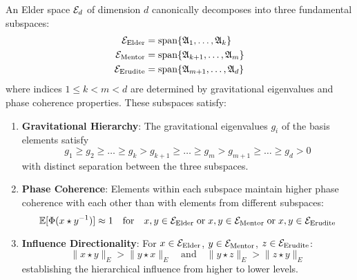 \begin{definition}
An Elder space $\mathcal{E}_{d}$ of dimension $d$ canonically decomposes into three fundamental subspaces:
\begin{align}
    \mathcal{E}_{\text{Elder}} &= \mathrm{span}\{\mathfrak{A}_{1}, \ldots, \mathfrak{A}_{k}\} \\
    \mathcal{E}_{\text{Mentor}} &= \mathrm{span}\{\mathfrak{A}_{k+1}, \ldots, \mathfrak{A}_{m}\} \\
    \mathcal{E}_{\text{Erudite}} &= \mathrm{span}\{\mathfrak{A}_{m+1}, \ldots, \mathfrak{A}_{d}\}
\end{align}
where indices $1 \leq k < m < d$ are determined by gravitational eigenvalues and phase coherence properties. These subspaces satisfy:

\begin{enumerate}
    \item \textbf{Gravitational Hierarchy}: The gravitational eigenvalues $g_i$ of the basis elements satisfy
    \begin{equation}
    g_1 \geq g_2 \geq \ldots \geq g_k > g_{k+1} \geq \ldots \geq g_m > g_{m+1} \geq \ldots \geq g_d > 0
    \end{equation}
    with distinct separation between the three subspaces.
    
    \item \textbf{Phase Coherence}: Elements within each subspace maintain higher phase coherence with each other than with elements from different subspaces:
    \begin{equation}
    \mathbb{E}[\Phi(x \star y^{-1})] \approx 1 \quad \text{for} \quad x,y \in \mathcal{E}_{\text{Elder}} \; \text{or} \; x,y \in \mathcal{E}_{\text{Mentor}} \; \text{or} \; x,y \in \mathcal{E}_{\text{Erudite}}
    \end{equation}
    
    \item \textbf{Influence Directionality}: For $x \in \mathcal{E}_{\text{Elder}}$, $y \in \mathcal{E}_{\text{Mentor}}$, $z \in \mathcal{E}_{\text{Erudite}}$:
    \begin{equation}
    \|x \star y\|_E > \|y \star x\|_E \quad \text{and} \quad \|y \star z\|_E > \|z \star y\|_E
    \end{equation}
    establishing the hierarchical influence from higher to lower levels.
\end{enumerate}
\end{definition}

